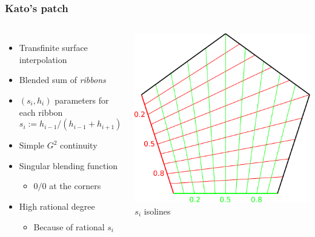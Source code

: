 \documentclass[xcolor=table]{beamer}
\begin{document}
\begin{frame}
  \frametitle{Kato's patch}
  \begin{columns}
    \begin{itemize}
    \item Transfinite surface interpolation
    \item Blended sum of \emph{ribbons}
    \item $(s_i,h_i)$ parameters for each ribbon
      \[ s_i := h_{i-1} / (h_{i-1} + h_{i+1}) \]
    \item Simple $G^2$ continuity
    \item Singular blending function
      \begin{itemize}
      \item $0/0$ at the corners
      \end{itemize}
    \item High rational degree
      \begin{itemize}
      \item Because of rational $s_i$
      \end{itemize}
    \end{itemize}
    \centering
    \includegraphics[width=.9\textwidth]{images/s-params.pdf}\\
    {\tiny $s_i$ isolines}\\
    \vspace{1em}

\end{columns}
\end{frame}
\end{document}
